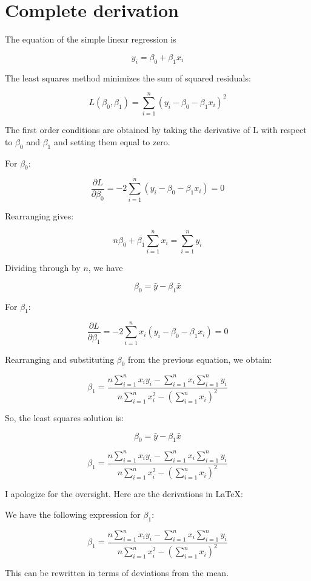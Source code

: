 \documentclass[12pt,a4paper, brazil]{article}
\begin{document}
\section{Complete derivation}

The equation of the simple linear regression is

$$
y_i = \beta_0 + \beta_1 x_i 
$$


The least squares method minimizes the sum of squared residuals:

$$
L(\beta_0, \beta_1) = \sum_{i=1}^{n} (y_i - \beta_0 - \beta_1 x_i)^2
$$

The first order conditions are obtained by taking the derivative of L with respect to $\beta_0$ and $\beta_1$ and setting them equal to zero. 

For $\beta_0$:

$$
\frac{\partial L}{\partial \beta_0} = -2 \sum_{i=1}^{n} (y_i - \beta_0 - \beta_1 x_i) = 0
$$

Rearranging gives:

$$
n\beta_0 + \beta_1 \sum_{i=1}^{n} x_i = \sum_{i=1}^{n} y_i
$$

Dividing through by $n$, we have

$$
\beta_0 = \bar{y} - \beta_1 \bar{x}
$$

For $\beta_1$:

$$
\frac{\partial L}{\partial \beta_1} = -2 \sum_{i=1}^{n} x_i (y_i - \beta_0 - \beta_1 x_i) = 0
$$


Rearranging and substituting $\beta_0$ from the previous equation, we obtain:

$$
\beta_1 = \frac{n \sum_{i=1}^{n} x_i y_i - \sum_{i=1}^{n} x_i \sum_{i=1}^{n} y_i}{n \sum_{i=1}^{n} x_i^2 - (\sum_{i=1}^{n} x_i)^2}
$$

So, the least squares solution is:

$$
\beta_0 = \bar{y} - \beta_1 \bar{x}
$$

$$
\beta_1 = \frac{n \sum_{i=1}^{n} x_i y_i - \sum_{i=1}^{n} x_i \sum_{i=1}^{n} y_i}{n \sum_{i=1}^{n} x_i^2 - (\sum_{i=1}^{n} x_i)^2}
$$

I apologize for the oversight. Here are the derivations in LaTeX:

We have the following expression for \(\beta_1\):

\[
\beta_1 = \frac{n \sum_{i=1}^{n} x_i y_i - \sum_{i=1}^{n} x_i \sum_{i=1}^{n} y_i}{n \sum_{i=1}^{n} x_i^2 - (\sum_{i=1}^{n} x_i)^2}
\]

This can be rewritten in terms of deviations from the mean. 
\end{document}
